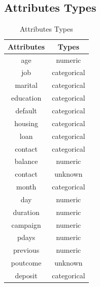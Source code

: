\documentclass[12pt]{article}
\begin{document}
\subsection{Attributes Types}

\begin{table}[h!]
	\centering
	\begin{tabular}{|c|c|}
			\hline
		\textbf{Attributes}& \textbf{Types}\\
		\hline
			\hline
	age	&numeric\\
		\hline
	job	&categorical\\
		\hline
	marital&	categorical\\
		\hline
	education&	categorical\\
		\hline
	default	&categorical\\
		\hline
	housing	&categorical\\
		\hline
	loan	&categorical\\
		\hline
	contact	&categorical\\
		\hline
	balance	&numeric\\
		\hline
	contact	&unknown\\
		\hline
	month&	categorical\\
		\hline
	day	&numeric\\
	    \hline
	duration&	numeric\\
		\hline
	campaign&	numeric\\
		\hline
	pdays	&numeric\\
		\hline
	previous&	numeric\\
		\hline
	poutcome	&unknown\\
		\hline
	deposit&	categorical\\
		\hline
	\end{tabular}

	\caption{Attributes Types}
\end{table}

\newpage
\end{document}
